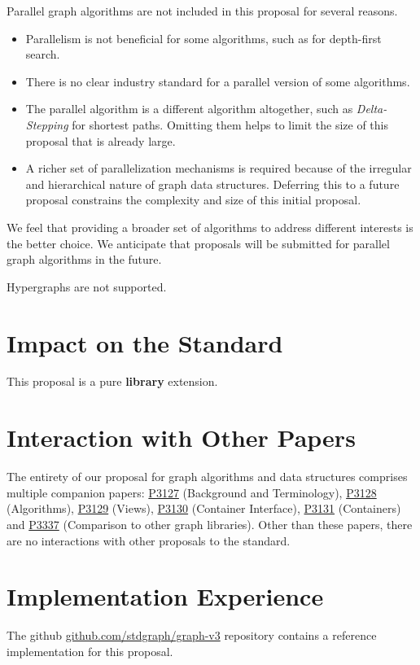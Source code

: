 Parallel graph algorithms are not included in this proposal for several reasons.
\begin{itemize}
      \item Parallelism is not beneficial for some algorithms, such as for depth-first search.
      \item There is no clear industry standard for a parallel version of some algorithms.
      \item The parallel algorithm is a different algorithm altogether, such as \textit{Delta-Stepping} for shortest paths. 
            Omitting them helps to limit the size of this proposal that is already large.
      \item A richer set of parallelization mechanisms is required because of the irregular and hierarchical nature of graph 
            data structures. Deferring this to a future proposal constrains the complexity and size of this initial proposal.
\end{itemize}
We feel that providing a broader set of algorithms to address different interests is the better choice. 
We anticipate that proposals will be submitted for parallel graph algorithms in the future. 

Hypergraphs are not supported.

\section{Impact on the Standard}
This proposal is a pure \textbf{library} extension.

\section{Interaction with Other Papers}
The entirety of our proposal for graph algorithms and data structures comprises multiple companion papers: \href{https://www.wg21.link/P3127}{P3127} (Background and Terminology), 
\href{https://www.wg21.link/P3128}{P3128} (Algorithms), \href{https://www.wg21.link/P3129}{P3129} (Views), \href{https://www.wg21.link/P3130}{P3130} (Container Interface), 
\href{https://www.wg21.link/P3131}{P3131} (Containers) and \href{https://www.wg21.link/P3337}{P3337} (Comparison to other graph libraries).
Other than these papers, there are no interactions with other proposals to the standard.

\section{Implementation Experience}
The github \href{https://github.com/stdgraph/graph-v3}{github.com/stdgraph/graph-v3} repository contains a reference implementation for this proposal.

